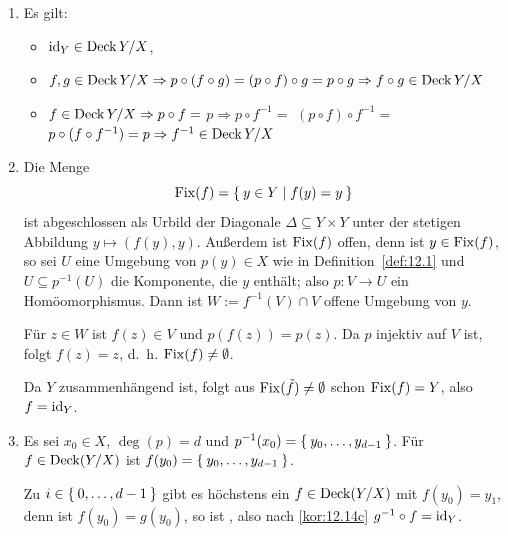 \begin{beweis}\leavevmode
    \begin{enumerate}[label=\alph*)]
        \item Es gilt:
            \begin{itemize}
                \item $\textnormal{id}_Y \in \operatorname{Deck}{Y/X}$,
                \item $f,g \in \operatorname{Deck}{Y/X} \Rightarrow p \circ (f \circ g) = (p \circ f) \circ g = p \circ g \Rightarrow f \circ g \in \operatorname{Deck}{Y/X}$
                \item $f \in \operatorname{Deck}{Y/X} \Rightarrow p \circ f =$
                      $p \Rightarrow p \circ f^{-1} =$
                      $(p \circ f) \circ f^{-1} =$
                      $p \circ (f \circ f^{-1}) = p \Rightarrow f^{-1} \in \operatorname{Deck}{Y/X}$
            \end{itemize}
        \item Die Menge
              \[\operatorname{Fix}(f) = \Set{y \in Y | f(y) = y}\]
              ist abgeschlossen als Urbild der Diagonale 
              $\Delta \subseteq Y \times Y$ unter der stetigen
              Abbildung $y \mapsto (f(y),y)$. Außerdem ist $\operatorname{Fix}(f)$
              offen, denn ist $y \in \operatorname{Fix}(f)$, so sei $U$ eine 
              Umgebung von $p(y) \in X$ wie in Definition~\ref{def:12.1}
              und $U \subseteq p^{-1}(U)$ die Komponente, die $y$
              enthält; also $p:V \rightarrow U$ ein Homöomorphismus.
              Dann ist $W := f^{-1}(V) \cap V$ offene Umgebung von $y$.

              Für $z \in W$ ist $f(z) \in V$ und $p(f(z)) = p(z)$.
              Da $p$ injektiv auf $V$ ist, folgt $f(z) = z$, d.~h.
              $\operatorname{Fix}(f) \neq \emptyset$.

              Da $Y$ zusammenhängend ist, folgt aus $\operatorname{Fix}(\tilde{f}) \neq \emptyset$
              schon $\operatorname{Fix}(f) = Y$, also $f = \textnormal{id}_Y$.
        \item Es sei $x_0 \in X$, $\deg(p) = d$ und $p^{-1}(x_0) = \Set{y_0, \dots, y_{d-1}}$.
              Für $f \in \operatorname{Deck}(Y/X)$ ist $f(y_0)= \Set{y_0, \dots, y_{d-1}}$.

              Zu $i \in \Set{0, \dots, d-1}$ gibt es höchstens ein 
              $f \in \operatorname{Deck}(Y/X)$ mit $f(y_0) = y_1$, denn ist
              $f(y_0) = g(y_0)$, so ist ,
              also nach \ref{kor:12.14c} $g^{-1} \circ f = \textnormal{id}_Y$.
    \end{enumerate}
\end{beweis}

